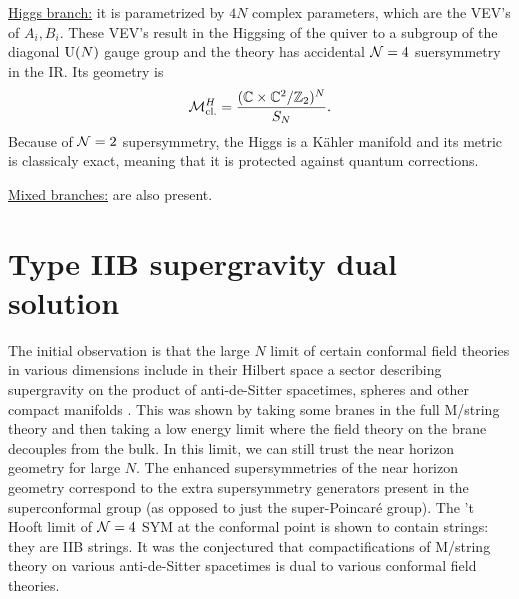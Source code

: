         \underline{Higgs branch:} it is parametrized by $4N$ complex parameters, which are the VEV's of $A_i,B_i$. These VEV's result in the Higgsing of the quiver to a subgroup of the diagonal $\text{U}(N)$ gauge group and the theory has accidental $\mathcal{N}=4$ suersymmetry in the IR. Its geometry is
        \begin{equation}
            \mathcal{M}^H_{\text{cl.}} = \frac{(\mathbb{C}\times\mathbb{C}^2/\mathbb{Z}_2)^N}{S_N}.
        \end{equation}
        Because of $\mathcal{N}=2$ supersymmetry, the Higgs is a Kähler manifold and its metric is classicaly exact, meaning that it is protected against quantum corrections.

        \underline{Mixed branches:} are also present.

\section{Type IIB supergravity dual solution}

    The initial observation is that the large $N$ limit of certain conformal field theories in various dimensions include in their Hilbert space a sector describing supergravity on the product of anti-de-Sitter spacetimes, spheres and other compact manifolds \cite{Maldacena:1997re}. This was shown by taking some branes in the full M/string theory and then taking a low energy limit where the field theory on the brane decouples from the bulk. In this limit, we can still trust the near horizon geometry for large $N$. The enhanced supersymmetries of the near horizon geometry correspond to the extra supersymmetry generators present in the superconformal group (as opposed to just the super-Poincaré group). The 't Hooft limit of $\mathcal{N} = 4$ SYM at the conformal point is shown to contain strings: they are IIB strings. It was the conjectured that compactifications of M/string theory on various anti-de-Sitter spacetimes is dual to various conformal field theories.

